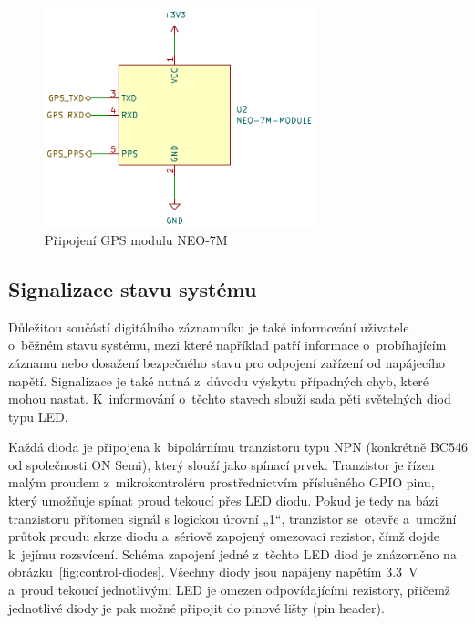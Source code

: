\begin{figure}[h]
    \centering
    \includegraphics[width=0.70\textwidth]{obrazky-figures/neo-7m.pdf}
    
    \caption{Připojení GPS modulu NEO-7M}
    \label{fig:neo-7m}
\end{figure}

\newpage

\subsection{Signalizace stavu systému}
Důležitou součástí digitálního záznamníku je také informování uživatele o~běžném stavu systému, mezi které například patří informace o~probíhajícím záznamu nebo dosažení bezpečného stavu pro odpojení zařízení od napájecího napětí. Signalizace je také nutná z~důvodu výskytu případných chyb, které mohou nastat. K~informování o~těchto stavech slouží sada pěti světelných diod typu LED.

Každá dioda je připojena k~bipolárnímu tranzistoru typu NPN (konkrétně BC546 od společnosti ON Semi), který slouží jako spínací prvek. Tranzistor je řízen malým proudem z~mikrokontroléru prostřednictvím příslušného GPIO pinu, který umožňuje spínat proud tekoucí přes LED diodu. Pokud je tedy na bázi tranzistoru přítomen signál s logickou úrovní „1“, tranzistor se~otevře a~umožní průtok proudu skrze diodu a~sériově zapojený omezovací rezistor, čímž dojde k~jejímu rozsvícení. Schéma zapojení jedné z~těchto LED diod je znázorněno na obrázku~\ref{fig:control-diodes}. Všechny diody jsou napájeny napětím \SI{3.3}{\volt} a~proud tekoucí jednotlivými LED je omezen odpovídajícími rezistory, přičemž jednotlivé diody je pak možné připojit do pinové lišty (pin header).

